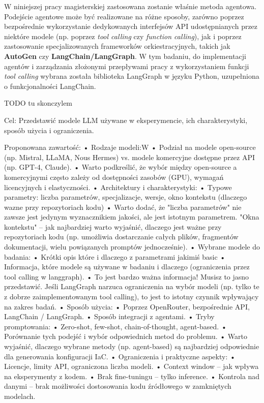 W niniejszej pracy magisterskiej zastosowana zostanie właśnie metoda agentowa. Podejście agentowe może być realizowane na różne sposoby, zarówno poprzez bezpośrednie wykorzystanie dedykowanych interfejsów API udostępnianych przez niektóre modele (np. poprzez \textit{tool calling} czy \textit{function calling}), jak i poprzez zastosowanie specjalizowanych frameworków orkiestracyjnych, takich jak \textbf{AutoGen} czy \textbf{LangChain/LangGraph}. W tym badaniu, do implementacji agentów i zarządzania złożonymi przepływami pracy z wykorzystaniem funkcji \textit{tool calling} wybrana została biblioteka LangGraph w języku Python, uzupełniona o funkcjonalności LangChain.

TODO tu skonczylem

Cel: Przedstawić modele LLM używane w eksperymencie, ich charakterystyki, sposób użycia i ograniczenia.

Proponowana zawartość:
	•	Rodzaje modeli:W
	•	    Podział na modele open-source (np. Mistral, LLaMA, Nous Hermes) vs. modele komercyjne dostępne przez API (np. GPT-4, Claude).
	•		Warto podkreślić, że wybór między open-source a komercyjnymi często zależy od dostępności zasobów (GPU), wymagań licencyjnych i elastyczności.
	•	Architektury i charakterystyki:
	•	    Typowe parametry: liczba parametrów, specjalizacje, wersje, okno kontekstu (dlaczego wazne przy repozytoriach kodu)
	•		Warto dodać, że "liczba parametrów" nie zawsze jest jedynym wyznacznikiem jakości, ale jest istotnym parametrem. "Okna kontekstu" – jak najbardziej warto wyjaśnić, dlaczego jest ważne przy repozytoriach kodu (np. umożliwia dostarczanie całych plików, fragmentów dokumentacji, wielu powiązanych promptów jednocześnie).
    •   Wybrane modele do badania:
    •       Krótki opis które i dlaczego z parametrami jakimiś basic
	• 		Informacja, które modele są używane w badaniu i dlaczego (ograniczenia przez tool calling w langgraph).
	•		To jest bardzo ważna informacja! Musisz to jasno przedstawić. Jeśli LangGraph narzuca ograniczenia na wybór modeli (np. tylko te z dobrze zaimplementowanym tool calling), to jest to istotny czynnik wpływający na zakres badań.
	•	Sposób użycia:
	•	    Poprzez OpenRouter, bezpośrednie API, LangChain / LangGraph.
	•	    Sposób integracji z agentami.
	•	Tryby promptowania:
	•	    Zero-shot, few-shot, chain-of-thought, agent-based.
	•	    Porównanie tych podejść i wybór odpowiednich metod do problemu.
	•		Warto wyjaśnić, dlaczego wybrane metody (np. agent-based) są najbardziej odpowiednie dla generowania konfiguracji IaC.
	•	Ograniczenia i praktyczne aspekty:
	•	    Licencje, limity API, ograniczona liczba modeli.
	•	    Context window – jak wpływa na eksperymenty z kodem.
	•	    Brak fine-tuningu – tylko inference.
	•	    Kontrola nad danymi – brak możliwości dostosowania kodu źródłowego w zamkniętych modelach.



